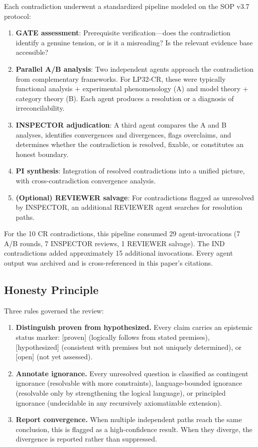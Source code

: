 \documentclass[12pt,a4paper]{article}
\theoremstyle{definition}
\theoremstyle{remark}
\begin{document}
Each contradiction underwent a standardized pipeline modeled on the SOP v3.7 protocol:

\begin{enumerate}[leftmargin=*,itemsep=0pt,topsep=0pt]
\item \textbf{GATE assessment}: Prerequisite verification---does the contradiction identify a genuine tension, or is it a misreading? Is the relevant evidence base accessible?
\item \textbf{Parallel A/B analysis}: Two independent agents approach the contradiction from complementary frameworks. For LP32-CR, these were typically functional analysis + experimental phenomenology (A) and model theory + category theory (B). Each agent produces a resolution or a diagnosis of irreconcilability.
\item \textbf{INSPECTOR adjudication}: A third agent compares the A and B analyses, identifies convergences and divergences, flags overclaims, and determines whether the contradiction is resolved, fixable, or constitutes an honest boundary.
\item \textbf{PI synthesis}: Integration of resolved contradictions into a unified picture, with cross-contradiction convergence analysis.
\item \textbf{(Optional) REVIEWER salvage}: For contradictions flagged as unresolved by INSPECTOR, an additional REVIEWER agent searches for resolution paths.
\end{enumerate}

For the 10 CR contradictions, this pipeline consumed 29 agent-invocations (7 A/B rounds, 7 INSPECTOR reviews, 1 REVIEWER salvage). The IND contradictions added approximately 15 additional invocations. Every agent output was archived and is cross-referenced in this paper's citations.

\subsection{Honesty Principle}

Three rules governed the review:

\begin{enumerate}[leftmargin=*,itemsep=0pt,topsep=0pt]
\item \textbf{Distinguish proven from hypothesized.} Every claim carries an epistemic status marker: \textsf{[proven]} (logically follows from stated premises), \textsf{[hypothesized]} (consistent with premises but not uniquely determined), or \textsf{[open]} (not yet assessed).
\item \textbf{Annotate ignorance.} Every unresolved question is classified as contingent ignorance (resolvable with more constraints), language-bounded ignorance (resolvable only by strengthening the logical language), or principled ignorance (undecidable in any recursively axiomatizable extension).
\item \textbf{Report convergence.} When multiple independent paths reach the same conclusion, this is flagged as a high-confidence result. When they diverge, the divergence is reported rather than suppressed.
\end{enumerate}
\end{document}

